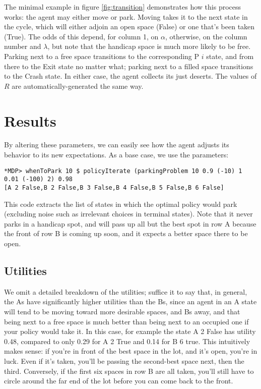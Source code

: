 \documentclass[paper=letter,pagesize=automedia,twoside=false,12pt]{scrartcl}
\theoremstyle{plain}%
\theoremstyle{definition}
\theoremstyle{remark}
\begin{document}
The minimal example in figure \ref{fig:transition} demonstrates how this process works: the agent may either move or park.  Moving takes it to the next state in the cycle, which will either adjoin an open space (False) or one that's been taken (True).  The odds of this depend, for column 1, on \(\alpha\), otherwise, on the column number and \(\lambda\), but note that the handicap space is much more likely to be free.  Parking next to a free space transitions to the corresponding P \(i\) state, and from there to the Exit state no matter what; parking next to a filled space transitions to the Crash state.  In either case, the agent collects its just deserts.  The values of \(R\) are automatically-generated the same way.

\section{Results}\label{sec:results}

By altering these parameters, we can easily see how the agent adjusts its behavior to its new expectations.  As a base case, we use the parameters:

\begin{verbatim}
*MDP> whenToPark 10 $ policyIterate (parkingProblem 10 0.9 (-10) 1 0.01 (-100) 2) 0.98
[A 2 False,B 2 False,B 3 False,B 4 False,B 5 False,B 6 False]
\end{verbatim}

This code extracts the list of states in which the optimal policy would park (excluding noise such as irrelevant choices in terminal states).  Note that it never parks in a handicap spot, and will pass up all but the best spot in row A because the front of row B is coming up soon, and it expects a better space there to be open.

\subsection{Utilities}\label{sec:utilities}

We omit a detailed breakdown of the utilities; suffice it to say that, in general, the As have significantly higher utilities than the Bs, since an agent in an A state will tend to be moving toward more desirable spaces, and Bs away, and that being next to a free space is much better than being next to an occupied one if your policy would take it.  In this case, for example the state A 2 False has utility 0.48, compared to only 0.29 for A 2 True and 0.14 for B 6 true.  This intuitively makes sense: if you're in front of the best space in the lot, and it's open, you're in luck.  Even if it's taken, you'll be passing the second-best space next, then the third.  Conversely, if the first six spaces in row B are all taken, you'll still have to circle around the far end of the lot before you can come back to the front.
\end{document}
